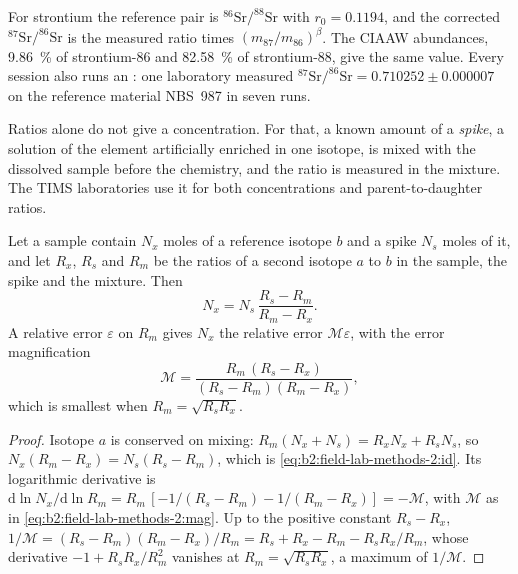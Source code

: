 For strontium the reference pair is $^{86}\mathrm{Sr}/^{88}\mathrm{Sr}$ with $r_0 = 0.1194$, and
the corrected $^{87}\mathrm{Sr}/^{86}\mathrm{Sr}$ is the measured ratio times
$(m_{87}/m_{86})^\beta$. The CIAAW abundances, \qty{9.86}{\percent} of strontium-86 and
\qty{82.58}{\percent} of strontium-88, give the same value. Every session also runs an : one laboratory measured $^{87}\mathrm{Sr}/^{86}\mathrm{Sr} = 0.710252 \pm
0.000007$ on the reference material NBS~987 in seven runs.

Ratios alone do not give a concentration. For that, a known amount of a \emph{spike}, a solution of
the element artificially enriched in one isotope, is mixed with the dissolved sample before the
chemistry, and the ratio is measured in the mixture. The TIMS laboratories use it for both
concentrations and parent-to-daughter ratios.

\begin{proposition}\label{prop:b2:field-lab-methods-2:id}
Let a sample contain $N_x$ moles of a reference isotope $b$ and a spike $N_s$ moles of it, and let
$R_x$, $R_s$ and $R_m$ be the ratios of a second isotope $a$ to $b$ in the sample, the spike and
the mixture. Then
\begin{equation}
N_x = N_s\,\frac{R_s - R_m}{R_m - R_x} .
\label{eq:b2:field-lab-methods-2:id}
\end{equation}
A relative error $\varepsilon$ on $R_m$ gives $N_x$ the relative error $\mathcal{M}\varepsilon$,
with the error magnification
\begin{equation}
\mathcal{M} = \frac{R_m\,(R_s - R_x)}{(R_s - R_m)(R_m - R_x)} ,
\label{eq:b2:field-lab-methods-2:mag}
\end{equation}
which is smallest when $R_m = \sqrt{R_s R_x}$.
\end{proposition}

\begin{proof}
Isotope $a$ is conserved on mixing: $R_m(N_x + N_s) = R_x N_x + R_s N_s$, so $N_x(R_m - R_x) =
N_s(R_s - R_m)$, which is \eqref{eq:b2:field-lab-methods-2:id}. Its logarithmic derivative is
$\mathrm{d}\ln N_x/\mathrm{d}\ln R_m = R_m\,[-1/(R_s - R_m) - 1/(R_m - R_x)] = -\mathcal{M}$, with
$\mathcal{M}$ as in \eqref{eq:b2:field-lab-methods-2:mag}. Up to the positive constant $R_s - R_x$,
$1/\mathcal{M} = (R_s - R_m)(R_m - R_x)/R_m = R_s + R_x - R_m - R_sR_x/R_m$, whose derivative
$-1 + R_sR_x/R_m^2$ vanishes at $R_m = \sqrt{R_sR_x}$, a maximum of $1/\mathcal{M}$.
\end{proof}

